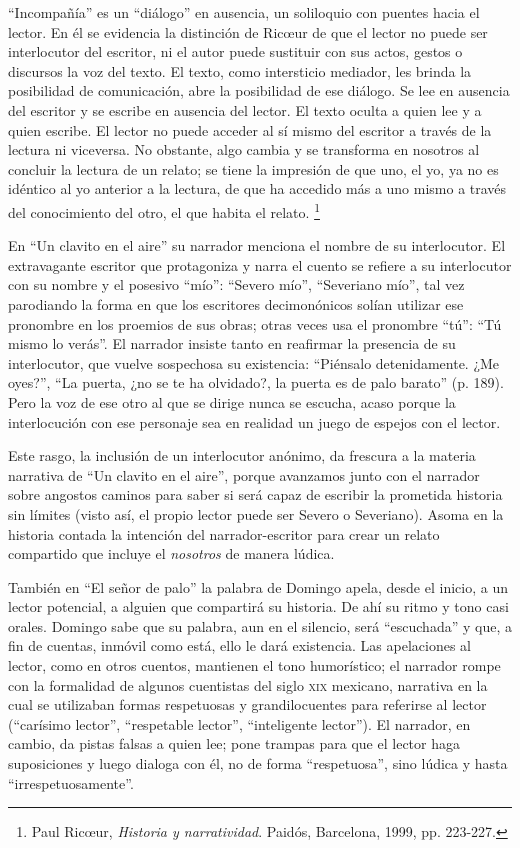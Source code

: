 \documentclass[14pt,twoside,final]{extbook} %
\let\oldfootnote\footnote
\renewcommand\footnote[1]{%
\oldfootnote{\hspace{1mm}#1}}
\begin{document}
``Incompañía'' es un ``diálogo'' en ausencia, un soliloquio con puentes hacia el lector. En él se evidencia la distinción de Ric\oe ur de que el lector no puede ser interlocutor del escritor, ni el autor puede sustituir con sus actos, gestos o discursos la voz del texto. El texto, como intersticio mediador, les brinda la posibilidad de comunicación, abre la posibilidad de ese diálogo. Se lee en ausencia del escritor y se escribe en ausencia del lector. El texto oculta a quien lee y a quien escribe. El lector no puede acceder al sí mismo del escritor a través de la lectura ni viceversa. No obstante, algo cambia y se transforma en nosotros al concluir la lectura de un relato; se tiene la impresión de que uno, el yo, ya no es idéntico al yo anterior a la lectura, de que ha accedido más a uno mismo a través del conocimiento del otro, el que habita el relato.\footnote{Paul Ric\oe ur, \emph{Historia y narratividad}. Paidós, Barcelona, 1999, pp. 223-227.}

En ``Un clavito en el aire'' su narrador menciona el nombre de su interlocutor. El extravagante escritor que protagoniza y narra el cuento se refiere a su interlocutor con su nombre y el posesivo ``mío'': ``Severo mío'', ``Severiano mío'', tal vez parodiando la forma en que los escritores decimonónicos solían utilizar ese pronombre en los proemios de sus obras; otras veces usa el pronombre ``tú'': ``Tú mismo lo verás''. El narrador insiste tanto en reafirmar la presencia de su interlocutor, que vuelve sospechosa su existencia: ``Piénsalo detenidamente. ¿Me oyes?'', ``La puerta, ¿no se te ha olvidado?, la puerta es de palo barato'' (p. 189). Pero la voz de ese otro al que se dirige nunca se escucha, acaso porque la interlocución con ese personaje sea en realidad un juego de espejos con el lector.

Este rasgo, la inclusión de un interlocutor anónimo, da frescura a la materia narrativa de ``Un clavito en el aire'', porque avanzamos junto con el narrador sobre angostos caminos para saber si será capaz de escribir la prometida historia sin límites (visto así, el propio lector puede ser Severo o Severiano). Asoma en la historia contada la intención del narrador-escritor para crear un relato compartido que incluye el \emph{nosotros} de manera lúdica.

También en ``El señor de palo'' la palabra de Domingo apela, desde el inicio, a un lector potencial, a alguien que compartirá su historia. De ahí su ritmo y tono casi orales. Domingo sabe que su palabra, aun en el silencio, será ``escuchada'' y que, a fin de cuentas, inmóvil como está, ello le dará existencia. Las apelaciones al lector, como en otros cuentos, mantienen el tono humorístico; el narrador rompe con la formalidad de algunos cuentistas del siglo \textsc{xix} mexicano, narrativa en la cual se utilizaban formas respetuosas y grandilocuentes para referirse al lector (``carísimo lector'', ``respetable lector'', ``inteligente lector''). El narrador, en cambio, da pistas falsas a quien lee; pone trampas para que el lector haga suposiciones y luego dialoga con él, no de forma ``respetuosa'', sino lúdica y hasta ``irrespetuosamente''.
\end{document}
